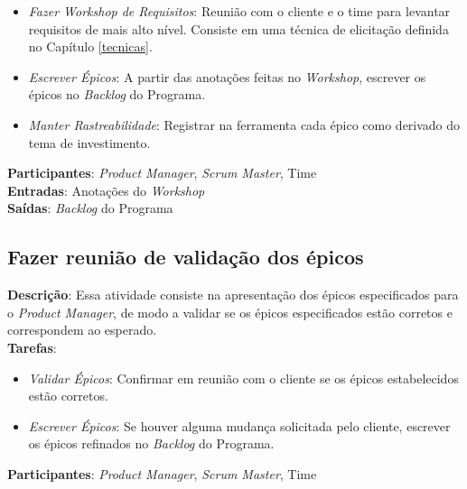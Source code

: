   \begin{itemize}
   \item \indent \textit{Fazer Workshop de Requisitos}: Reunião com o cliente e o time para levantar requisitos de mais alto nível. Consiste
   em uma técnica de elicitação definida no Capítulo \ref{tecnicas}.

   \item \indent \textit{Escrever Épicos}: A partir das anotações feitas no \textit{Workshop},
   escrever os épicos no \textit{Backlog} do Programa.
   
   \item \indent \textit{Manter Rastreabilidade}: Registrar na ferramenta cada épico como derivado do tema de investimento.

  \end{itemize}

  \textbf{Participantes}: \textit{Product Manager}, \textit{Scrum Master}, Time \\

  \textbf{Entradas}: Anotações do \textit{Workshop} \\

  \textbf{Saídas}: \textit{Backlog} do Programa \\

\subsection{Fazer reunião de validação dos épicos}
  \textbf{Descrição}: Essa atividade consiste na apresentação dos épicos especificados para o \textit{Product Manager}, de modo a validar se os épicos
  especificados estão corretos e correspondem ao esperado. \\

  \textbf{Tarefas}:

  \begin{itemize}
    \item \indent \textit{Validar Épicos}: Confirmar em reunião com o cliente se os épicos estabelecidos estão corretos.

   \item \indent \textit{Escrever Épicos}: Se houver alguma mudança solicitada pelo cliente, escrever os épicos
   refinados no \textit{Backlog} do Programa.
  \end{itemize}

  \textbf{Participantes}: \textit{Product Manager}, \textit{Scrum Master}, Time \\

